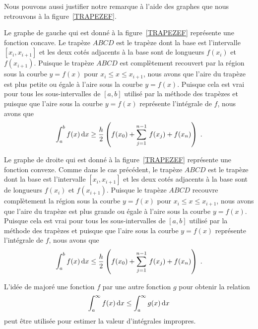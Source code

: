{\begin{rmk}
Nous pouvons aussi justifier notre remarque à l'aide des graphes que
nous retrouvons à la figure~\ref{TRAPEZEF}.

Le graphe de gauche qui est donné à la figure~\ref{TRAPEZEF} représente une
fonction concave.  Le trapèze \mbox{\trapeze$ABCD$} est le trapèze dont la
base est l'intervalle $[x_i,x_{i+1}]$ et les deux cotés adjacents à la
base sont de longueurs $f(x_i)$ et $f(x_{i+1})$.  Puisque le trapèze
\mbox{\trapeze$ABCD$} est complètement recouvert par la région sous la courbe
$y=f(x)$ pour $x_i \leq x \leq x_{i+1}$, nous avons que l'aire du trapèze
est plus petite ou égale à l'aire sous la courbe $y=f(x)$.  Puisque
cela est vrai pour tous les sous-intervalles de $[a,b]$ utilisé par la
méthode des trapèzes et puisque que l'aire sous la courbe $y=f(x)$
représente l'intégrale de $f$, nous avons que
\[
\int_a^b f(x) \,\mathrm{d}x \geq
\frac{h}{2} \left( f(x_0) + \sum_{j=1}^{n-1}\,f(x_j) + f(x_n) \right) \; .
\]

Le graphe de droite qui est donné à la figure~\ref{TRAPEZEF} représente une
fonction convexe.  Comme dans le cas précédent, le trapèze
\mbox{\trapeze$ABCD$} est le trapèze dont la base est l'intervalle
$[x_i,x_{i+1}]$ et les deux cotés adjacents à la base sont de
longueurs $f(x_i)$ et $f(x_{i+1})$.  Puisque
le trapèze \mbox{\trapeze$ABCD$} recouvre complètement la région sous la
courbe $y=f(x)$ pour $x_i \leq x \leq x_{i+1}$, nous avons que l'aire du
trapèze est plus grande ou égale à l'aire sous la courbe $y=f(x)$.
Puisque cela est vrai pour tous les sous-intervalles de $[a,b]$
utilisé par la méthode des trapèzes et puisque que l'aire sous la
courbe $y=f(x)$ représente l'intégrale de $f$, nous avons que
\[
\int_a^b f(x) \,\mathrm{d}x \leq 
\frac{h}{2} \left( f(x_0) + \sum_{j=1}^{n-1}\,f(x_j) + f(x_n) \right) \; .
\]
\end{rmk}


L'idée de majoré une fonction $f$ par une autre fonction $g$ pour
obtenir la relation
\[
\int_a^\infty f(x) \,\mathrm{d}x  \leq \int_a^\infty g(x) \,\mathrm{d}x
\]
peut être utilisée pour estimer la valeur d'intégrales impropres.

}
